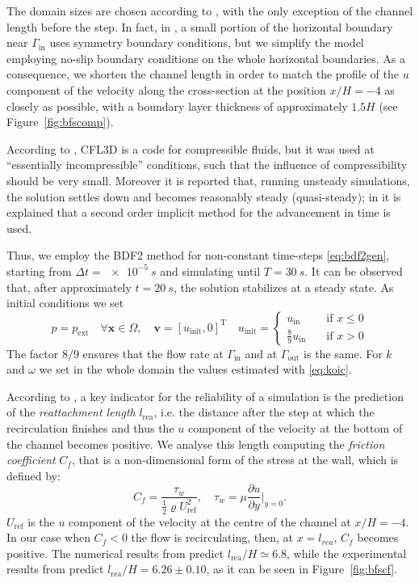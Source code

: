 The domain sizes are chosen according to \cite{web:nasa}, with the only 
exception of the channel length before the step. In fact, in \cite{web:nasa}, a 
small portion of the horizontal boundary near $\Gamma_\text{in}$ uses symmetry 
boundary conditions, but we simplify the model employing no-slip boundary 
conditions on the whole horizontal boundaries. As a consequence, we shorten the 
channel length in order to match the profile of the $u$ 
component of the velocity along the cross-section at the position $x/H=-4$ as closely as possible, 
with a boundary layer thickness of approximately $1.5H$ (see 
Figure~\ref{fig:bfscomp}).

According to \cite{web:nasa}, CFL3D is a code for compressible fluids, but it was used at ``essentially incompressible'' conditions, such that the influence of compressibility should be very small. Moreover it is reported that, running unsteady simulations, the solution settles down and becomes reasonably steady (quasi-steady); in \cite{bfs:cfl3d} it is explained that a second order implicit method for the advancement in time is used.

Thus, we employ the BDF2 method for non-constant time-steps \eqref{eq:bdf2gen}, starting from $\Delta t = \SI{e-5}{s}$ and simulating until $T = \SI{30}{s}$. It can be observed that, after approximately $t=\SI{20}{s}$, the solution stabilizes at a steady state. As initial conditions we set
\begin{equation}
p=p_\text{ext} \quad \forall \mathbf{x} \in \Omega, \quad \mathbf{v} = [u_\text{init},0]^\mathrm{T} \quad u_\text{init} = \begin{cases}
u_\text{in} \quad&\text{if $x\leq 0$}\\
\frac{8}{9}u_\text{in} \quad&\text{if $x>0$}
\end{cases}
\end{equation}
The factor $8/9$ ensures that the flow rate at $\Gamma_\text{in}$ and at $\Gamma_\text{out}$ is the same. For $k$ and $\omega$ we set in the whole domain the values estimated with \eqref{eq:koic}.

According to \cite{web:nasa}, a key indicator for the reliability of a 
simulation is the prediction of the \emph{reattachment length} $l_\text{rea}$, 
i.e. the distance after the step at which the recirculation finishes and thus 
the $u$ component of the velocity at the bottom of the channel becomes 
positive. We analyse this length computing the \emph{friction coefficient} 
$C_f$, that is a non-dimensional form of the stress at the wall, which is 
defined by:
\begin{equation}
C_f = \frac{\tau_w}{\frac{1}{2}\varrho U_\text{ref}^2}, \quad \tau_w = \mu \frac{\partial u}{\partial y} \Big|_{y=0}.
\end{equation}
$U_\text{ref}$ is the $u$ component of the velocity at the centre of the channel at $x/H=-4$. In our case when $C_f<0$ the flow is recirculating, then, at $x=l_{rea}$, $C_f$ becomes positive. The numerical results from \cite{web:nasa} predict $l_\text{rea}/H \simeq 6.8$, while the experimental results from \cite{bfs:driver} predict $l_\text{rea}/H = 6.26 \pm 0.10$, as it can be seen in Figure~\ref{fig:bfscf}.

